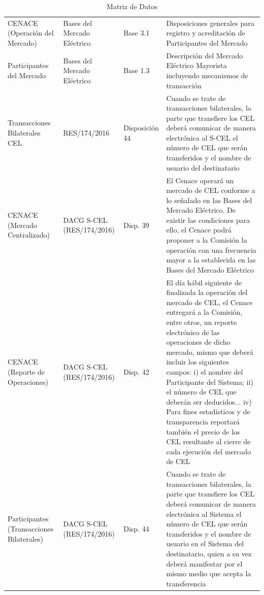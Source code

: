 \documentclass{cel}
\begin{document}
\vspace{0.3cm}
\begin{tabladoradoLargo}
\renewcommand{\tabularxcolumn}[1]{p{#1}}
\begin{xltabular}{\textwidth}{|X|X|X|X|}
\caption{Matriz de Datos} \\
\toprule
{}  &  &  &  \\
\midrule
\endhead
CENACE (Operación del Mercado) & Bases del Mercado Eléctrico & Base 3.1 & \textquotedbl{}Disposiciones generales\textquotedbl{} para registro y acreditación de Participantes del Mercado \\ \hline
Participantes del Mercado & Bases del Mercado Eléctrico & Base 1.3 & \textquotedbl{}Descripción del Mercado Eléctrico Mayorista\textquotedbl{} incluyendo mecanismos de transacción \\ \hline
Transacciones Bilaterales CEL & RES/174/2016 & Disposición 44 & \textquotedbl{}Cuando se trate de transacciones bilaterales, la parte que transfiere los CEL deberá comunicar de manera electrónica al S-CEL el número de CEL que serán transferidos y el nombre de usuario del destinatario\textquotedbl{} \\ \hline
CENACE (Mercado Centralizado) & DACG S-CEL (RES/174/2016) & Disp. 39 & \textquotedbl{}El Cenace operará un mercado de CEL conforme a lo señalado en las Bases del Mercado Eléctrico. De existir las condiciones para ello, el Cenace podrá proponer a la Comisión la operación con una frecuencia mayor a la establecida en las Bases del Mercado Eléctrico\textquotedbl{} \\ \hline
CENACE (Reporte de Operaciones) & DACG S-CEL (RES/174/2016) & Disp. 42 & \textquotedbl{}El día hábil siguiente de finalizada la operación del mercado de CEL, el Cenace entregará a la Comisión, entre otros, un reporte electrónico de las operaciones de dicho mercado, mismo que deberá incluir los siguientes campos: i) el nombre del Participante del Sistema; ii) el número de CEL que deberán ser deducidos... iv) Para fines estadísticos y de transparencia reportará también el precio de los CEL resultante al cierre de cada ejecución del mercado de CEL\textquotedbl{} \\ \hline
Participantes (Transacciones Bilaterales) & DACG S-CEL (RES/174/2016) & Disp. 44 & \textquotedbl{}Cuando se trate de transacciones bilaterales, la parte que transfiere los CEL deberá comunicar de manera electrónica al Sistema el número de CEL que serán transferidos y el nombre de usuario en el Sistema del destinatario, quien a su vez deberá manifestar por el mismo medio que acepta la transferencia\textquotedbl{} \\ \hline

\end{xltabular}
\end{tabladoradoLargo}
\end{document}
